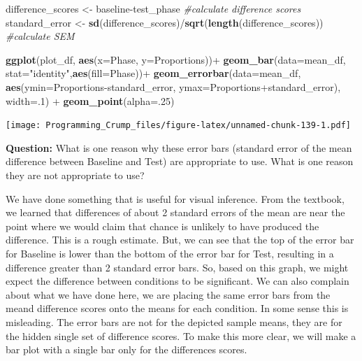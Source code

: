 \documentclass[]{book}
\newenvironment{Shaded}{\begin{snugshade}}{\end{snugshade}}
\newcommand{\KeywordTok}[1]{\textcolor[rgb]{0.13,0.29,0.53}{\textbf{{#1}}}}
\newcommand{\DataTypeTok}[1]{\textcolor[rgb]{0.13,0.29,0.53}{{#1}}}
\newcommand{\DecValTok}[1]{\textcolor[rgb]{0.00,0.00,0.81}{{#1}}}
\newcommand{\StringTok}[1]{\textcolor[rgb]{0.31,0.60,0.02}{{#1}}}
\newcommand{\CommentTok}[1]{\textcolor[rgb]{0.56,0.35,0.01}{\textit{{#1}}}}
\newcommand{\NormalTok}[1]{{#1}}
\theoremstyle{definition}
\theoremstyle{definition}
\theoremstyle{definition}
\theoremstyle{remark}
\begin{document}
\begin{Shaded}
\begin{Highlighting}[]
\NormalTok{difference_scores <-}\StringTok{ }\NormalTok{baseline-test_phase }\CommentTok{#calculate difference scores}
\NormalTok{standard_error <-}\StringTok{ }\KeywordTok{sd}\NormalTok{(difference_scores)/}\KeywordTok{sqrt}\NormalTok{(}\KeywordTok{length}\NormalTok{(difference_scores)) }\CommentTok{#calculate SEM}


\KeywordTok{ggplot}\NormalTok{(plot_df, }\KeywordTok{aes}\NormalTok{(}\DataTypeTok{x=}\NormalTok{Phase, }\DataTypeTok{y=}\NormalTok{Proportions))+}\StringTok{ }
\StringTok{  }\KeywordTok{geom_bar}\NormalTok{(}\DataTypeTok{data=}\NormalTok{mean_df, }\DataTypeTok{stat=}\StringTok{"identity"}\NormalTok{,}\KeywordTok{aes}\NormalTok{(}\DataTypeTok{fill=}\NormalTok{Phase))+}
\StringTok{  }\KeywordTok{geom_errorbar}\NormalTok{(}\DataTypeTok{data=}\NormalTok{mean_df, }\KeywordTok{aes}\NormalTok{(}\DataTypeTok{ymin=}\NormalTok{Proportions-standard_error, }
                                  \DataTypeTok{ymax=}\NormalTok{Proportions+standard_error), }\DataTypeTok{width=}\NormalTok{.}\DecValTok{1}\NormalTok{) +}
\StringTok{  }\KeywordTok{geom_point}\NormalTok{(}\DataTypeTok{alpha=}\NormalTok{.}\DecValTok{25}\NormalTok{)}
\end{Highlighting}
\end{Shaded}

\texttt{[image: Programming\_Crump\_files/figure-latex/unnamed-chunk-139-1.pdf]}

\textbf{Question:} What is one reason why these error bars (standard
error of the mean difference between Baseline and Test) are appropriate
to use. What is one reason they are not appropriate to use?

We have done something that is useful for visual inference. From the
textbook, we learned that differences of about 2 standard errors of the
mean are near the point where we would claim that chance is unlikely to
have produced the difference. This is a rough estimate. But, we can see
that the top of the error bar for Baseline is lower than the bottom of
the error bar for Test, resulting in a difference greater than 2
standard error bars. So, based on this graph, we might expect the
difference between conditions to be significant. We can also complain
about what we have done here, we are placing the same error bars from
the meand difference scores onto the means for each condition. In some
sense this is misleading. The error bars are not for the depicted sample
means, they are for the hidden single set of difference scores. To make
this more clear, we will make a bar plot with a single bar only for the
differences scores.
\end{document}
